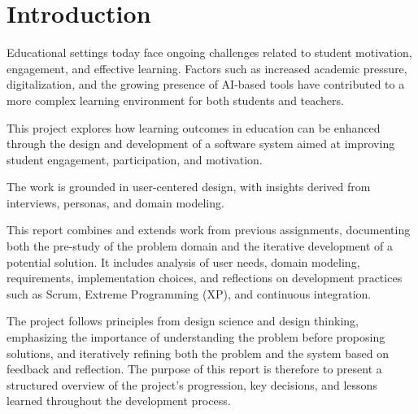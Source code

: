 \section{Introduction}

Educational settings today face ongoing challenges related to student motivation, engagement,
and effective learning.
Factors such as increased academic pressure, digitalization, and the
growing presence of AI-based tools have contributed to a more complex learning environment
for both students and teachers.

This project explores how learning outcomes in education can be enhanced through the design
and development of a software system aimed at improving student engagement, participation,
and motivation.

The work is grounded in user-centered design, with insights derived from
interviews, personas, and domain modeling.

This report combines and extends work from previous assignments, documenting both the
pre-study of the problem domain and the iterative development of a potential solution.
It includes analysis of user needs, domain modeling, requirements, implementation choices,
and reflections on development practices such as Scrum, Extreme Programming (XP), and
continuous integration.

The project follows principles from design science and design thinking, emphasizing the
importance of understanding the problem before proposing solutions, and iteratively refining
both the problem and the system based on feedback and reflection.
The purpose of this report is therefore to present a structured overview of the project’s progression,
key decisions, and lessons learned throughout the development process.
